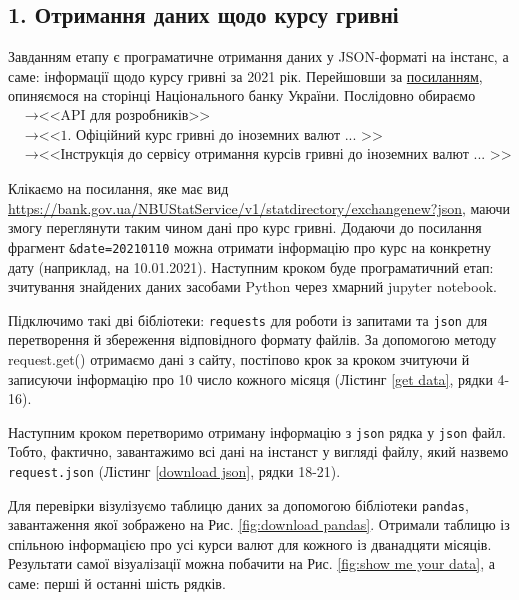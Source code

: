 \documentclass[a4paper,14pt]{extarticle} %
\begin{document}
\subsection*{1. Отримання даних щодо курсу гривні}

Завданням етапу є програматичне отримання даних у JSON-форматі на інстанс, а саме: інформації щодо курсу гривні 
за 2021 рік. Перейшовши за \href{https://bank.gov.ua/ua/open-data/api-dev}{посиланням}, опиняємося на сторінці 
Національного банку України. Послідовно обираємо 
\begin{align*}
    &\rightarrow \text{<<API для розробників>>} \\ 
    &\rightarrow \text{<<1. Офіційний курс гривні до іноземних валют ... >>} \\ 
    &\rightarrow \text{<<Інструкція до сервісу отримання курсів гривні до іноземних валют ... >>}
\end{align*}

Клікаємо на посилання, яке має вид
\url{https://bank.gov.ua/NBUStatService/v1/statdirectory/exchangenew?json}, маючи змогу переглянути таким 
чином дані про курс гривні. Додаючи до посилання фрагмент \texttt{\&date=20210110} можна отримати інформацію про курс на 
конкретну дату (наприклад, на 10.01.2021). Наступним кроком буде програматичний етап: зчитування знайдених даних засобами 
Python через хмарний jupyter notebook.

Підключимо такі дві бібліотеки: \texttt{requests} для роботи із запитами та \texttt{json} для перетворення й 
збереження відповідного формату файлів. За допомогою методу request.get() отримаємо дані з сайту, постіпово крок за 
кроком зчитуючи й записуючи інформацію про 10 число кожного місяця (Лістинг \ref{get data}, рядки 4-16).
 


Наступним кроком перетворимо отриману інформацію з \texttt{json} рядка у \texttt{json} файл. Тобто, фактично, 
завантажимо всі дані на інстанст у вигляді файлу, який назвемо \texttt{request.json} (Лістинг \ref{download json}, рядки 18-21). 


Для перевірки візулізуємо таблицю даних за допомогою бібліотеки \texttt{pandas}, завантаження якої зображено на 
Рис. \ref{fig:download pandas}. Отримали таблицю із спільною інформацією про усі курси валют для кожного із 
дванадцяти місяців. Результати самої візуалізації можна побачити на Рис. \ref{fig:show me your data}, а саме: 
перші й останні шість рядків.
\end{document}

